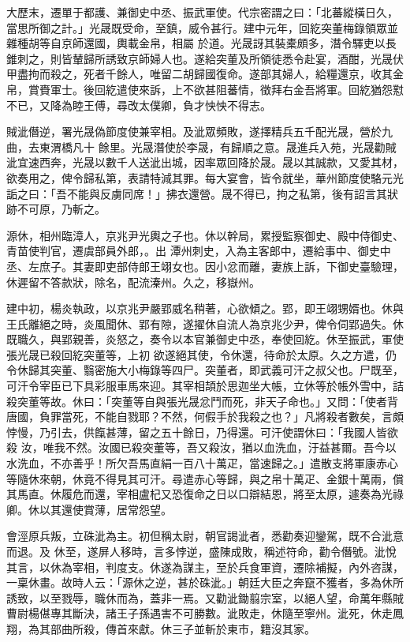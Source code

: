 \begin{pinyinscope}
 大歷末，遷單于都護、兼御史中丞、振武軍使。代宗密謂之曰：「北蕃縱橫日久，當思所御之計。」光晟既受命，至鎮，威令甚行。建中元年，回紇突董梅錄領眾並雜種胡等自京師還國，輿載金帛，相屬
 於道。光晟訝其裝橐頗多，潛令驛吏以長錐刺之，則皆輦歸所誘致京師婦人也。遂給突董及所領徒悉令赴宴，酒酣，光晟伏甲盡拘而殺之，死者千餘人，唯留二胡歸國復命。遂部其婦人，給糧還京，收其金帛，賞賚軍士。後回紇遣使來訴，上不欲甚阻蕃情，徵拜右金吾將軍。回紇猶怨懟不已，又降為睦王傅，尋改太僕卿，負才怏怏不得志。



 賊泚僭逆，署光晟偽節度使兼宰相。及泚眾頻敗，遂擇精兵五千配光晟，營於九曲，去東渭橋凡十
 餘里。光晟潛使於李晟，有歸順之意。晟進兵入苑，光晟勸賊泚宜速西奔，光晟以數千人送泚出城，因率眾回降於晟。晟以其誠款，又愛其材，欲奏用之，俾令歸私第，表請特減其罪。每大宴會，皆令就坐，華州節度使駱元光詬之曰：「吾不能與反虜同席！」拂衣還營。晟不得已，拘之私第，後有詔言其狀跡不可原，乃斬之。



 源休，相州臨漳人，京兆尹光輿之子也。休以幹局，累授監察御史、殿中侍御史、青苗使判官，遷虞部員外郎，。出
 潭州刺史，入為主客郎中，遷給事中、御史中丞、左庶子。其妻即吏部侍郎王翊女也。因小忿而離，妻族上訴，下御史臺驗理，休遲留不答款狀，除名，配流溱州。久之，移嶽州。



 建中初，楊炎執政，以京兆尹嚴郢威名稍著，心欲傾之。郢，即王翊甥婿也。休與王氏離絕之時，炎風聞休、郢有隙，遂擢休自流人為京兆少尹，俾令伺郢過失。休既職久，與郢親善，炎怒之，奏令以本官兼御史中丞，奉使回紇。休至振武，軍使張光晟已殺回紇突董等，上初
 欲遂絕其使，令休還，待命於太原。久之方遣，仍令休歸其突董、翳密施大小梅錄等四尸。突董者，即武義可汗之叔父也。尸既至，可汗令宰臣已下具彩服車馬來迎。其宰相頡於思迦坐大帳，立休等於帳外雪中，詰殺突董等故。休曰：「突董等自與張光晟忿鬥而死，非天子命也。」又問：「使者背唐國，負罪當死，不能自戮耶？不然，何假手於我殺之也？」凡將殺者數矣，言頗悖慢，乃引去，供餼甚薄，留之五十餘日，乃得還。可汗使謂休曰：「我國人皆欲殺
 汝，唯我不然。汝國已殺突董等，吾又殺汝，猶以血洗血，汙益甚爾。吾今以水洗血，不亦善乎！所欠吾馬直絹一百八十萬疋，當速歸之。」遣散支將軍康赤心等隨休來朝，休竟不得見其可汗。尋遣赤心等歸，與之帛十萬疋、金銀十萬兩，償其馬直。休履危而還，宰相盧杞又恐復命之日以口辯結恩，將至太原，遽奏為光祿卿。休以其還使賞薄，居常怨望。



 會涇原兵叛，立硃泚為主。初但稱太尉，朝官謁泚者，悉勸奏迎鑾駕，既不合泚意而退。及
 休至，遂屏人移時，言多悖逆，盛陳成敗，稱述符命，勸令僭號。泚悅其言，以休為宰相，判度支。休遂為謀主，至於兵食軍資，遷除補擬，內外咨謀，一稟休畫。故時人云：「源休之逆，甚於硃泚。」朝廷大臣之奔竄不獲者，多為休所誘致，以至戮辱，職休而為，蓋非一焉。又勸泚鋤翦宗室，以絕人望，命萬年縣賊曹尉楊偡專其斷決，諸王子孫遇害不可勝數。泚敗走，休隨至寧州。泚死，休走鳳翔，為其部曲所殺，傳首來獻。休三子並斬於東市，籍沒其家。




\end{pinyinscope}
